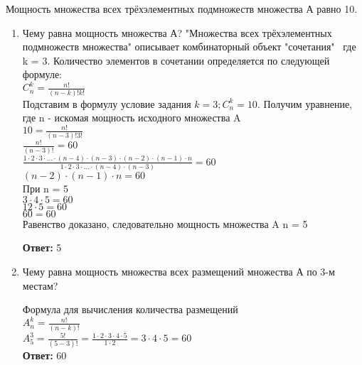 \documentclass[a4paper,14pt]{extarticle}
\begin{document}
	
	\noindent Мощность множества всех трёхэлементных подмножеств множества А равно 10.
	
	\begin{enumerate}[№1. ]
		\item Чему равна мощность множества А?\bigbreak
		"Множества всех трёхэлементных подмножеств множества" описывает комбинаторный объект "сочетания" \, где k = 3. Количество элементов в сочетании определяется по следующей формуле:\\
		$C^k_n=\frac{n!}{(n-k)!k!}$\\
		Подставим в формулу условие задания $k=3; C^k_n = 10$. Получим уравнение, где n - искомая мощность исходного множества A\\
		$10=\frac{n!}{(n-3)!3!}$\\
		$\frac{n!}{(n-3)!}=60$\\
		$\frac{1\cdot2\cdot3\cdot...\cdot(n-4)\cdot(n-3)\cdot(n-2)\cdot(n-1)\cdot n}{1\cdot2\cdot3\cdot...\cdot(n-4)\cdot(n-3)}=60$\\
		$(n-2)\cdot(n-1)\cdot n = 60$\\
		При n = 5\\
		$3\cdot4\cdot5=60$\\
		$12\cdot5=60$\\
		$60=60$\\
		Равенство доказано, следовательно мощность множества A n = 5
		
		\textbf{Ответ:} 5
		
		\item Чему равна мощность множества всех размещений множества А по 3-м местам?
		
		Формула для вычисления количества размещений\\
		$A^k_n=\frac{n!}{(n-k)!}$\\
		$A^3_5=\frac{5!}{(5-3)!}=\frac{1\cdot2\cdot3\cdot4\cdot5}{1\cdot2}=3\cdot4\cdot5=60$\\
		
		\textbf{Ответ:} 60
		
	\end{enumerate}
	
	
\end{document}
